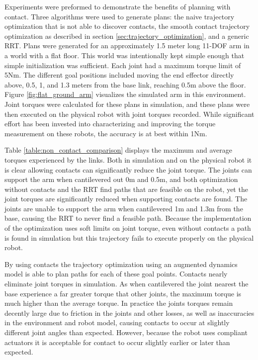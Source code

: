 \documentclass[../thesis.tex]{subfiles}
\begin{document}
Experiments were preformed to demonstrate the benefits of planning with contact.
Three algorithms were used to generate plans: the naive trajectory optimization that is not able to discover contacts, the smooth contact trajectory optimization as described in section \ref{sec:trajectory_optimization},  and a generic RRT. 
Plans were generated for an approximately 1.5 meter long 11-DOF arm in a world with a flat floor.
This world was intentionally kept simple enough that simple initialization was sufficient.
Each joint had a maximum torque limit of 5Nm.
The different goal positions included moving the end effector directly above, 0.5, 1, and 1.3 meters from the base link, reaching 0.5m above the floor.
Figure \ref{fig:flat_ground_arm} visualizes the simulated arm in this environment.
Joint torques were calculated for these plans in simulation, and these plans were then executed on the physical robot with joint torques recorded.
While significant effort has been invested into characterizing and improving the torque measurement on these robots, the accuracy is at best within 1Nm.


Table \ref{table:non_contact_comparison} displays the maximum and average torques experienced by the links.
Both in simulation and on the physical robot it is clear allowing contacts can significantly reduce the joint torque.
The joints can support the arm when cantilevered out 0m and 0.5m, and both optimization without contacts and the RRT find paths that are feasible on the robot, yet the joint torques are significantly reduced when supporting contacts are found.
The joints are unable to support the arm when cantilevered 1m and 1.3m from the base, causing the RRT to never find a feasible path.
Because the implementation of the optimization uses soft limits on joint torque, even without contacts a path is found in simulation but this trajectory fails to execute properly on the physical robot.

By using contacts the trajectory optimization using an augmented dynamics model is able to plan paths for each of these goal points.
Contacts nearly eliminate joint torques in simulation.
As when cantilevered the joint nearest the base experience a far greater torque that other joints, the maximum torque is much higher than the average torque.
In practice the joints torques remain decently large due to friction in the joints and other losses, as well as inaccuracies in the environment and robot model, causing contacts to occur at slightly different joint angles than expected.
However, because the robot uses compliant actuators it is acceptable for contact to occur slightly earlier or later than expected.
\end{document}
